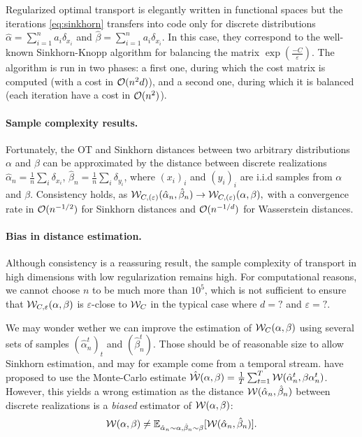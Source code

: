 Regularized optimal transport is elegantly written in functional spaces but the
iterations \eqref{eq:sinkhorn} transfers into code only for discrete
distributions $\hat \alpha = \sum_{i=1}^n a_i \delta_{x_i}$ and $\hat \beta =
\sum_{i=1}^n a_i \delta_{x_i}$. In this case, they correspond to the well-known
Sinkhorn-Knopp algorithm for balancing the matrix
$\exp(\frac{-C}{\varepsilon})$. The algorithm is run in two phases: a first one,
during which the cost matrix is computed (with a cost in $\mathcal{O}(n^2 d)$), and a
second one, during which it is balanced (each iteration have a cost in
$\mathcal{O}(n^2)$).

\paragraph{Sample complexity results.} Fortunately, the OT and Sinkhorn distances between two arbitrary distributions
$\alpha$ and $\beta$ can be approximated by the distance between discrete
realizations $\hat \alpha_n = \frac{1}{n} \sum_i \delta_{x_i}$, 
$\hat \beta_n = \frac{1}{n} \sum_i \delta_{y_i}$, where $(x_i)_i$
and $(y_i)_i$ are i.i.d samples from $\alpha$ and $\beta$. Consistency holds, as
$\mathcal{W}_{C, (\varepsilon)}(\hat \alpha_n, \hat \beta_n) \to \mathcal{W}_{C, (\varepsilon)}(\alpha, \beta),$
with a convergence rate in $\mathcal{O}(n^{-1/2})$ for Sinkhorn distances and $\mathcal{O}(n^{-1/d})$ for
Wasserstein distances.

\paragraph{Bias in distance estimation.} Although consistency is a reassuring result, the
sample complexity of transport in high dimensions with low regularization
remains high. For computational reasons, we cannot choose $n$ to be much more
than $10^5$, which is not sufficient to ensure that $\mathcal{W}_{C,\varepsilon}(\alpha,
\beta)$ is $\varepsilon$-close to $\mathcal{W}_C$ in the typical case where $d=?$ and
$\varepsilon = ?$.

We may wonder wether we can improve the estimation of $\mathcal{W}_{C}(\alpha,\beta)$
using several sets of samples $(\hat \alpha_n^t)_t$ and $(\hat \beta_n^t)$. Those should be of 
reasonable size to allow Sinkhorn estimation, and may for example come from a temporal stream. \cite{}\cite{} have proposed to use 
the Monte-Carlo estimate $\hat {\mathcal{W}}(\alpha, \beta) = \frac{1}{T} \sum_{t=1}^T
\mathcal{W}(\hat \alpha_n^t, \beta \alpha_n^t)$. However, this yields a wrong estimation
as the distance $\mathcal{W}(\hat \alpha_n, \hat \beta_n)$ between discrete realizations
is a \textit{biased} estimator of $\mathcal{W}(\alpha, \beta)$:
\begin{equation}
    \mathcal{W}(\alpha, \beta) \neq 
    \mathbb{E}_{\hat \alpha_n \sim \alpha, \hat \beta_n \sim \beta} [\mathcal{W}(\hat \alpha_n, \hat \beta_n)].
\end{equation}

